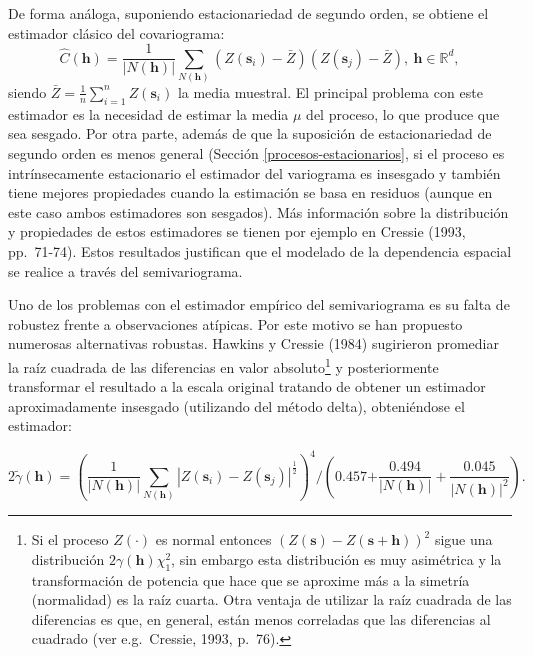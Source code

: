 \documentclass[
  spanish,
]{book}
\theoremstyle{break}
\theoremstyle{definition}
\theoremstyle{definition}
\theoremstyle{definition}
\theoremstyle{definition}
\theoremstyle{remark}
\begin{document}
De forma análoga, suponiendo estacionariedad de segundo orden, se obtiene el estimador clásico del covariograma:
\[\hat{C} (\mathbf{h}) = \dfrac{1}{\left| N(\mathbf{h})\right| }
\sum\limits_{N(\mathbf{h})}\left( Z(\mathbf{s}_{i})-\bar{Z} \right)
\left( Z(\mathbf{s}_{j})-\bar{Z} \right),\ \mathbf{h}\in \mathbb{R}^{d},\]
siendo \(\bar{Z} =\frac{1}{n} \sum_{i=1}^{n}Z(\mathbf{s}_{i})\) la media muestral.
El principal problema con este estimador es la necesidad de estimar la media \(\mu\) del proceso, lo que produce que sea sesgado.
Por otra parte, además de que la suposición de estacionariedad de segundo orden es menos general (Sección \ref{procesos-estacionarios}, si el proceso es intrínsecamente estacionario el estimador del variograma es insesgado y también tiene mejores propiedades cuando la estimación se basa en residuos (aunque en este caso ambos estimadores son sesgados).
Más información sobre la distribución y propiedades de estos estimadores se tienen por ejemplo en Cressie (1993, pp.~71-74).
Estos resultados justifican que el modelado de la dependencia espacial se realice a través del semivariograma.

Uno de los problemas con el estimador empírico del semivariograma es su falta de robustez frente a observaciones atípicas.
Por este motivo se han propuesto numerosas alternativas robustas.
Hawkins y Cressie (1984) sugirieron promediar la raíz cuadrada de las diferencias en valor absoluto\footnote{Si el proceso \(Z(\cdot)\) es normal entonces \((Z(\mathbf{s})-Z(\mathbf{s}+\mathbf{h}))^2\) sigue una distribución \(2\gamma(\mathbf{h})\chi_1^2\), sin embargo esta distribución es muy asimétrica y la transformación de potencia que hace que se aproxime más a la simetría (normalidad) es la raíz cuarta. Otra ventaja de utilizar la raíz cuadrada de las diferencias es que, en general, están menos correladas que las diferencias al cuadrado (ver e.g.~Cressie, 1993, p.~76).} y posteriormente transformar el resultado a la escala original tratando de obtener un estimador aproximadamente insesgado (utilizando del método delta), obteniéndose el estimador:

\[2\tilde{\gamma}(\mathbf{h}) = \left( \dfrac{1}{\left| N(\mathbf{h})\right| }
\sum\limits_{N(\mathbf{h})}\left| Z(\mathbf{s}_{i})-Z(\mathbf{s}_{j}
)\right|^{\frac{1}{2} } \right)^{4} /\left( \text{0.457+}
\dfrac{\text{0.494} }{\left| N(\mathbf{h})\right| } +\dfrac{\text{0.045}
}{\left| N(\mathbf{h})\right|^2 } \right).\]
\end{document}
